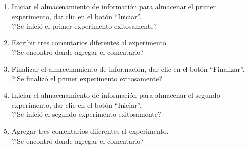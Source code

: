 \begin{enumerate}
	\item {Iniciar el almacenamiento de información para almacenar el primer experimento, dar clic en el botón ``Iniciar''.\\
			?`Se inició el primer experimento exitosamente?
	}
	\item {Escribir tres comentarios diferentes al experimento.\\
			?`Se encontró donde agregar el comentario?
	}
	\item {Finalizar el almacenamiento de información, dar clic en el botón ``Finalizar''.\\
			?`Se finalizó el primer experimento exitosamente?
	}
	\item {Iniciar el almacenamiento de información para almacenar el segundo experimento, dar clic en el botón ``Iniciar''.\\
			?`Se inició el segundo experimento exitosamente?
	}
	\item {Agregar tres comentarios diferentes al experimento.\\
			?`Se encontró donde agregar el comentario?
	}
\end{enumerate}
